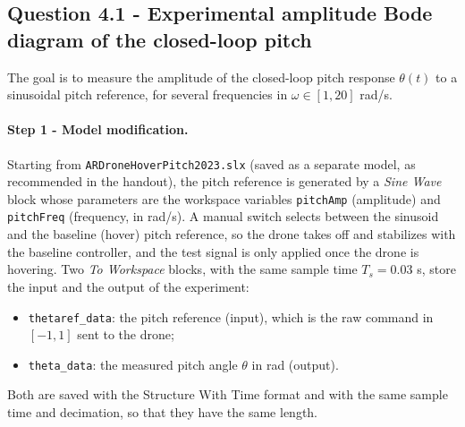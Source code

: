 \subsection*{Question 4.1 - Experimental amplitude Bode diagram of the closed-loop pitch}

The goal is to measure the amplitude of the closed-loop pitch response $\theta(t)$ to a sinusoidal pitch reference, for several frequencies in $\omega \in [1, 20]$ rad/s.

\paragraph{Step 1 - Model modification.}
Starting from \texttt{ARDroneHoverPitch2023.slx} (saved as a separate model, as recommended in the handout), the pitch reference is generated by a \emph{Sine Wave} block whose parameters are the workspace variables \texttt{pitchAmp} (amplitude) and \texttt{pitchFreq} (frequency, in rad/s).
A manual switch selects between the sinusoid and the baseline (hover) pitch reference, so the drone takes off and stabilizes with the baseline controller, and the test signal is only applied once the drone is hovering.
Two \emph{To Workspace} blocks, with the same sample time $T_s = 0.03$ s, store the input and the output of the experiment:
\begin{itemize}
\item \texttt{thetaref\_data}: the pitch reference (input), which is the raw command in $[-1, 1]$ sent to the drone;
\item \texttt{theta\_data}: the measured pitch angle $\theta$ in rad (output).
\end{itemize}
Both are saved with the Structure With Time format and with the same sample time and decimation, so that they have the same length.

